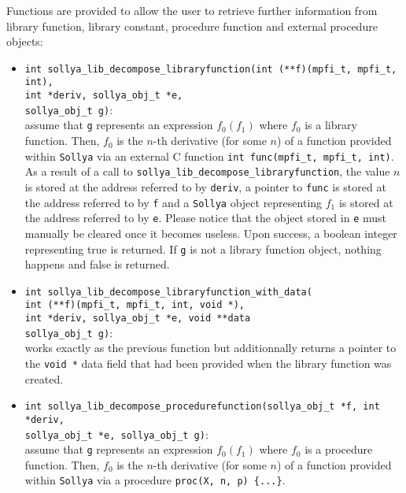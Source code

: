 \documentclass[a4paper]{article}
\newcommand{\sollya}{\texttt{Sollya}\xspace}
\begin{document}
Functions are provided to allow the user to retrieve further information from library function, library constant, procedure function and external procedure objects:
\begin{itemize}
\item \verb|int sollya_lib_decompose_libraryfunction(int (**f)(mpfi_t, mpfi_t, int),|\\
\verb|int *deriv, sollya_obj_t *e,|\\
\verb|sollya_obj_t g)|:\\ assume that \verb|g| represents an expression $f_0(f_1)$ where $f_0$ is a library function. Then, $f_0$ is the $n$-th derivative (for some $n$) of a function provided within \sollya via an external C function \verb|int func(mpfi_t, mpfi_t, int)|.\\
As a result of a call to \verb|sollya_lib_decompose_libraryfunction|, the value $n$ is stored at the address referred to by \verb|deriv|, a pointer to \verb|func| is stored at the address referred to by \verb|f| and a \sollya object representing $f_1$ is stored at the address referred to by \verb|e|. Please notice that the object stored in \verb|e| must manually be cleared once it becomes useless. Upon success, a boolean integer representing true is returned. If \verb|g| is not a library function object, nothing happens and false is returned.
\item \verb|int sollya_lib_decompose_libraryfunction_with_data(|\\
\verb|int (**f)(mpfi_t, mpfi_t, int, void *),|\\
\verb|int *deriv, sollya_obj_t *e, void **data|\\
\verb|sollya_obj_t g)|:\\ works exactly as the previous function but additionnally returns a pointer to the \verb|void *| data field that had been provided when the library function was created.
\item \verb|int sollya_lib_decompose_procedurefunction(sollya_obj_t *f, int *deriv,|\\
\verb|sollya_obj_t *e, sollya_obj_t g)|:\\
assume that \verb|g| represents an expression $f_0(f_1)$ where $f_0$ is a procedure function. Then, $f_0$ is the $n$-th derivative (for some $n$) of a function provided within \sollya via a procedure \verb|proc(X, n, p) {...}|.\\

\end{itemize}
\end{document}
